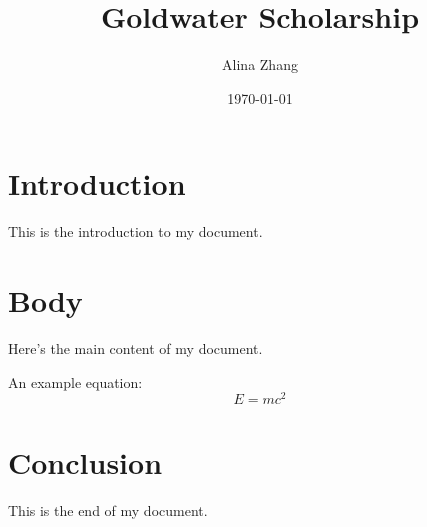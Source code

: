 \documentclass[12pt]{article}
\title{Goldwater Scholarship}
\author{Alina Zhang}
\date{\today}           %
\begin{document}
\maketitle              %

\section{Introduction}
This is the introduction to my document.

\section{Body}
Here's the main content of my document. 

An example equation:
\begin{equation}
    E = mc^2
\end{equation}

\section{Conclusion}
This is the end of my document.
\end{document}
